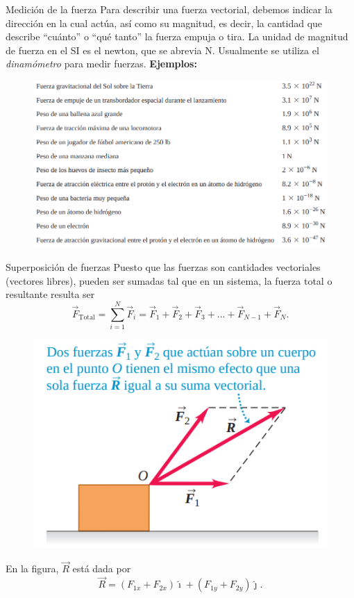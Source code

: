 \begin{frame}{Medición de la fuerza}
    Para describir una fuerza vectorial, debemos indicar la dirección en la cual actúa, así como su magnitud, es decir, la cantidad que describe “cuánto” o “qué tanto” la fuerza empuja o tira. La unidad de magnitud de fuerza en el SI es el newton, que se abrevia N. Usualmente se utiliza el \textit{dinamómetro} para medir fuerzas. \textbf{Ejemplos:}

    \begin{figure}
        \centering
        \includegraphics[width=0.8\linewidth]{figures/image.png}
    \end{figure}
\end{frame}

\begin{frame}{Superposición de fuerzas}
    Puesto que las fuerzas son cantidades vectoriales (vectores libres), pueden ser sumadas tal que en un sistema, la fuerza total o resultante resulta ser \begin{equation}
        \vec{F}_{\text{Total}}=\sum_{i=1}^N\vec{F}_i=\vec{F}_1+\vec{F}_2+\vec{F}_3+\dots+\vec{F}_{N-1}+\vec{F}_N.
    \end{equation}

    \begin{figure}
        \centering
        \includegraphics[width=0.4\linewidth]{figures/superposicion.png}
    \end{figure}
    En la figura, $\vec{R}$ está dada por 
    \begin{equation}
    \vec{R}=(F_{1x}+F_{2x})\hat{\imath}+(F_{1y}+F_{2y})\hat{\jmath}.
\end{equation}
\end{frame}

